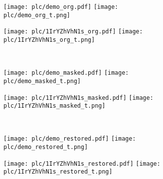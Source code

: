 \documentclass{article}
\begin{document}
\begin{figure}[h!]
    \centering
    \begin{subfigure}[b]{0.49\linewidth}
        \texttt{[image: plc/demo\_org.pdf]}
        \hfill
        \texttt{[image: plc/demo\_org\_t.png]}
    \end{subfigure}    
    \begin{subfigure}[b]{0.49\linewidth}
        \texttt{[image: plc/1IrYZhVhN1s\_org.pdf]}
        \hfill
        \texttt{[image: plc/1IrYZhVhN1s\_org\_t.png]}
    \end{subfigure}
    \\
    \begin{subfigure}[b]{0.49\linewidth}
        \texttt{[image: plc/demo\_masked.pdf]}
        \hfill
        \texttt{[image: plc/demo\_masked\_t.png]}
    \end{subfigure}    
    \begin{subfigure}[b]{0.49\linewidth}
        \texttt{[image: plc/1IrYZhVhN1s\_masked.pdf]}
        \hfill
        \texttt{[image: plc/1IrYZhVhN1s\_masked\_t.png]}
    \end{subfigure}
    \\
    \begin{subfigure}[b]{0.49\linewidth}
        \texttt{[image: plc/demo\_restored.pdf]}
        \hfill
        \texttt{[image: plc/demo\_restored\_t.png]}
\label{fig:app:plc:a}
    \end{subfigure} 
    \begin{subfigure}[b]{0.49\linewidth}
        \texttt{[image: plc/1IrYZhVhN1s\_restored.pdf]}
        \hfill
        \texttt{[image: plc/1IrYZhVhN1s\_restored\_t.png]}
\end{subfigure}
\end{figure}
\end{document}
